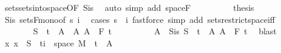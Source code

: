 \begin{isabellebody}
\ sets{\isachardot}{\kern0pt}sets{\isacharunderscore}{\kern0pt}into{\isacharunderscore}{\kern0pt}space{\isacharbrackleft}{\kern0pt}OF\ S{\isacharunderscore}{\kern0pt}is{\isacharparenleft}{\kern0pt}{}{\isacharparenright}{\kern0pt}{\isacharbrackright}{\kern0pt}\ \isamarkupfalse%
\ {\isacharparenleft}{\kern0pt}auto\ simp\ add{\isacharcolon}{\kern0pt}\ space{\isacharunderscore}{\kern0pt}F{\isacharparenright}{\kern0pt}\isanewline
\ \ \ \ \ \ \isamarkupfalse%
\ \isamarkupfalse%
\ {\isacharquery}{\kern0pt}thesis\ \isamarkupfalse%
\ S{\isacharunderscore}{\kern0pt}is\ sets{\isacharunderscore}{\kern0pt}F{\isacharunderscore}{\kern0pt}mono{\isacharbrackleft}{\kern0pt}of\ s\ i{\isacharbrackright}{\kern0pt}\ \isamarkupfalse%
\ {\isacharparenleft}{\kern0pt}cases\ {\isachardoublequoteopen}s\ {\isasymle}\ i{\isachardoublequoteclose}{\isacharparenright}{\kern0pt}\ {\isacharparenleft}{\kern0pt}fastforce\ simp\ add{\isacharcolon}{\kern0pt}\ sets{\isacharunderscore}{\kern0pt}restrict{\isacharunderscore}{\kern0pt}space{\isacharunderscore}{\kern0pt}iff{\isacharparenright}{\kern0pt}{\isacharplus}{\kern0pt}\isanewline
\ \ \ \ \isamarkupfalse%
\isanewline
\ \ \ \ \ \ \isamarkupfalse%
\ {\isachardoublequoteopen}S\ {\isasymin}\ {\isacharbraceleft}{\kern0pt}{\isacharbraceleft}{\kern0pt}t\ {\isasymtimes}\ A\ {\isacharbar}{\kern0pt}\ A{\isachardot}{\kern0pt}\ A\ {\isasymin}\ F\ t\isanewline
\ \ \ \ \ \ \isamarkupfalse%
\ \isamarkupfalse%
\ A\ \ S{\isacharunderscore}{\kern0pt}is{\isacharcolon}{\kern0pt}\ {\isachardoublequoteopen}S\ {\isacharequal}{\kern0pt}\ {\isacharbraceleft}{\kern0pt}t\ {\isasymtimes}\ A{\isachardoublequoteclose}\ {\isachardoublequoteopen}A\ {\isasymin}\ F\ t\ \isamarkupfalse%
\ blast\isanewline
\ \ \ \ \ \ \isamarkupfalse%
\ {\isachardoublequoteopen}{\isacharparenleft}{\kern0pt}{\isasymlambda}x{\isachardot}{\kern0pt}\ x{\isacharparenright}{\kern0pt}\ {\isacharminus}{\kern0pt}{\isacharbackquote}{\kern0pt}\ S\ {\isasyminter}\ {\isacharparenleft}{\kern0pt}{\isacharbraceleft}{\kern0pt}ti{\isacharbraceright}{\kern0pt}\ {\isasymtimes}\ space\ M{\isacharparenright}{\kern0pt}\ {\isacharequal}{\kern0pt}\ {\isacharbraceleft}{\kern0pt}t\ {\isasymtimes}\ A{\isachardoublequoteclose}\ \isamarkupfalse%

\end{isabellebody}
